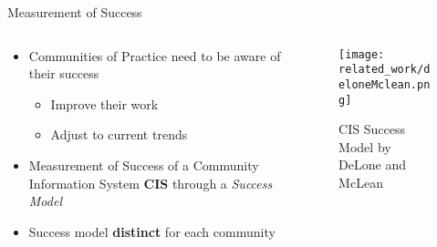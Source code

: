 \begin{frame}{Measurement of Success}
  \begin{columns}
    \begin{column}[]{0.3\textwidth}
      \begin{itemize}
        \item Communities of Practice need to be aware of their success
              \begin{itemize}
                \item Improve their work
                \item Adjust to current trends
              \end{itemize}
              \item Measurement of Success of a Community Information System \textbf{CIS} through a \emph{Success Model}
              \item Success model \textbf{distinct} for each community
      \end{itemize}
    \end{column}
    \begin{column}[]{0.7\textwidth}
      \begin{figure}
        \centering
        \texttt{[image: related\_work/deloneMclean.png]}
        \caption{CIS Success Model by DeLone and McLean \cite{DeMc92}}
      \end{figure}
    \end{column}
  \end{columns}
\end{frame}



